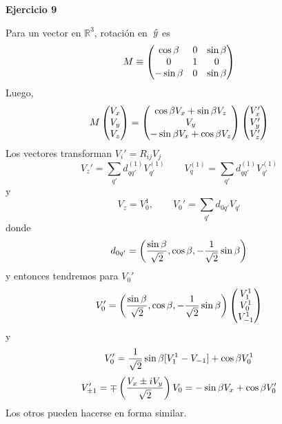 \documentclass[10pt,oneside]{CBFT_book}
\begin{document}
\begin{ejemplo}{\bf Ejercicio 9}

Para un vector en $\mathbb{R}^3$, rotación en $\:\hat{y}$ es
\[
	M \equiv \begin{pmatrix}
	\cos \beta & 0 & \sin \beta \\
	0 & 1 & 0 \\
	-\sin \beta & 0 & \sin \beta \\
	\end{pmatrix}
\]
Luego, 
\[
	M \begin{pmatrix}
	   V_x \\
	   V_y \\
	   V_z
	  \end{pmatrix} =
		\begin{pmatrix}
		\cos \beta V_x + \sin \beta V_z \\
		V_y \\
		-\sin \beta V_x +  \cos \beta V_z \\
		\end{pmatrix}
	  \begin{pmatrix}
	   V_x' \\
	   V_y' \\
	   V_z'
	  \end{pmatrix}
\]
Los vectores transforman $ V_i' = R_{ij} V_j $
\[
	V_z' = \sum_{q'} d_{qq'}^{(1)} V_{q'}^{(1)} 
	\qquad 
	V_q^{(1)} = \sum_{q'} d_{qq'}^{(1)} V_{q'}^{(1)} 
\]
y
\[
	V_z = V_0^1, \qquad V_0' = \sum_{q'} d_{0q'} V_{q'}
\]
donde
\[
	d_{0q'} = \left(
	\frac{\sin\beta}{\sqrt{2}}, \cos\beta, - \frac{1}{\sqrt{2}}\sin\beta \right)
\]
y entonces tendremos para $V_0'$
\[
	V_0' = \left(
	\frac{\sin\beta}{\sqrt{2}}, \cos\beta, - \frac{1}{\sqrt{2}}\sin\beta \right)
	\begin{pmatrix}
	V_1^1 \\
	V_0^1 \\
	V_{-1}^1
	\end{pmatrix}
\]
y
\[
	V_0' = \frac{1}{\sqrt{2}} \sin\beta [ V_1^1 - V_{-1}] + \cos\beta V_0^1
\]
\[
	V_{\pm 1}' = \mp \left( \frac{  V_x \pm i V_y  }{ \sqrt{2} } \right) V_0 =
	- \sin\beta V_x + \cos\beta V_0'
\]
Los otros pueden hacerse en forma similar.
 
\end{ejemplo}
\end{document}
